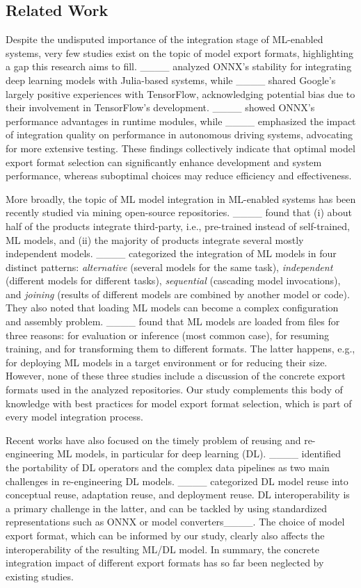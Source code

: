 \subsection{Related Work}
Despite the undisputed importance of the integration stage of ML-enabled systems, very few studies exist on the topic of model export formats, highlighting a gap this research aims to fill.
____ analyzed ONNX's stability for integrating deep learning models with Julia-based systems, while ____ shared Google's largely positive experiences with TensorFlow, acknowledging potential bias due to their involvement in TensorFlow's development.
____ showed ONNX's performance advantages in runtime modules, while ____ emphasized the impact of integration quality on performance in autonomous driving systems, advocating for more extensive testing.
These findings collectively indicate that optimal model export format selection can significantly enhance development and system performance, whereas suboptimal choices may reduce efficiency and effectiveness.

More broadly, the topic of ML model integration in ML-enabled systems has been recently studied via mining open-source repositories.
____ found that (i) about half of the products integrate third-party, i.e., pre-trained instead of self-trained, ML models, and (ii) the majority of products integrate several mostly independent models.
____ categorized the integration of ML models in four distinct patterns: \textit{alternative} (several models for the same task), \textit{independent} (different models for different tasks), \textit{sequential} (cascading model invocations), and \textit{joining} (results of different models are combined by another model or code). 
They also noted that loading ML models can become a complex configuration and assembly problem. 
____ found that ML models are loaded from files for three reasons: for evaluation or inference (most common case), for resuming training, and for transforming them to different formats.
The latter happens, e.g., for deploying ML models in a target environment or for reducing their size.
However, none of these three studies include a discussion of the concrete export formats used in the analyzed repositories.
Our study complements this body of knowledge with best practices for model export format selection, which is part of every model integration process.

Recent works have also focused on the timely problem of reusing and re-engineering ML models, in particular for deep learning (DL).
____ identified the portability of DL operators  and the complex data pipelines as two main challenges in re-engineering DL models.
____ categorized DL model reuse into conceptual reuse, adaptation reuse, and deployment reuse.
DL interoperability is a primary challenge in the latter, and can be tackled by using standardized representations such as ONNX or model converters____.
The choice of model export format, which can be informed by our study, clearly also affects the interoperability of the resulting ML/DL model.
In summary, the concrete integration impact of different export formats has so far been neglected by existing studies.